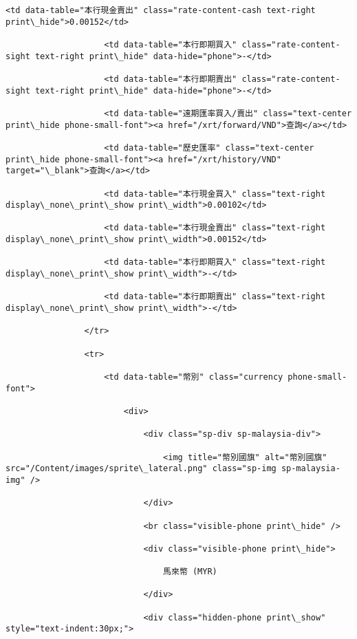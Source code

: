 \documentclass[11pt]{article}
\begin{document}
\begin{Verbatim}[commandchars=\\\{\}]
                    <td data-table="本行現金賣出" class="rate-content-cash text-right print\_hide">0.00152</td>

                    <td data-table="本行即期買入" class="rate-content-sight text-right print\_hide" data-hide="phone">-</td>

                    <td data-table="本行即期賣出" class="rate-content-sight text-right print\_hide" data-hide="phone">-</td>

                    <td data-table="遠期匯率買入/賣出" class="text-center print\_hide phone-small-font"><a href="/xrt/forward/VND">查詢</a></td>

                    <td data-table="歷史匯率" class="text-center print\_hide phone-small-font"><a href="/xrt/history/VND" target="\_blank">查詢</a></td>

                    <td data-table="本行現金買入" class="text-right display\_none\_print\_show print\_width">0.00102</td>

                    <td data-table="本行現金賣出" class="text-right display\_none\_print\_show print\_width">0.00152</td>

                    <td data-table="本行即期買入" class="text-right display\_none\_print\_show print\_width">-</td>

                    <td data-table="本行即期賣出" class="text-right display\_none\_print\_show print\_width">-</td>

                </tr>

                <tr>

                    <td data-table="幣別" class="currency phone-small-font">

                        <div>

                            <div class="sp-div sp-malaysia-div">

                                <img title="幣別國旗" alt="幣別國旗" src="/Content/images/sprite\_lateral.png" class="sp-img sp-malaysia-img" />

                            </div>

                            <br class="visible-phone print\_hide" />

                            <div class="visible-phone print\_hide">

                                馬來幣 (MYR)

                            </div>

                            <div class="hidden-phone print\_show" style="text-indent:30px;">


\end{Verbatim}
\end{document}
